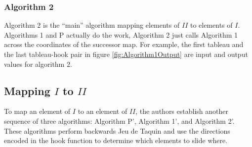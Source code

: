 \documentclass[11pt]{article}
\theoremstyle{definition}
\begin{document}
\subsubsection{Algorithm 2}
Algorithm 2 is the ``main'' algorithm mapping elements of $II$ to elements of $I$. Algorithms 1 and P actually do the work, Algorithm 2 just calls Algorithm 1 across the coordinates of the successor map. For example, the first tableau and the last tableau-hook pair in figure \ref{fig:Algorithm1Output} are input and output values for algorithm 2.\\

\begin{algorithm}[H]
\SetAlgoLongEnd
\end{algorithm}
\subsection{Mapping $I$ to $II$}
To map an element of $I$ to an element of $II$, the authors establish another sequence of three algorithms: Algorithm P', Algorithm 1', and Algorithm 2'. These algorithms perform backwards Jeu de Taquin and use the directions encoded in the hook function to determine which elements to slide where.
\end{document}
